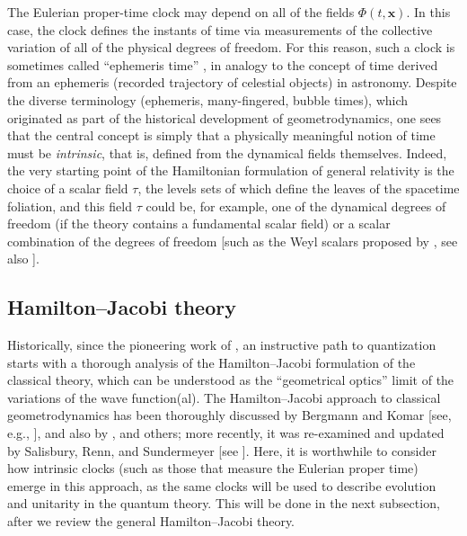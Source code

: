 \documentclass[12pt]{iopart}
\def\x{\mathbf{x}}
\begin{document}
The Eulerian proper-time clock may depend on all of the fields $\Phi(t,\x)$. In this case, the clock defines the instants of time via measurements of the collective variation of all of the physical degrees of freedom. For this reason, such a clock is sometimes called ``ephemeris time'' \citep{Barbour:1994ri,Barbour:1994rj}, in analogy to the concept of time derived from an ephemeris (recorded trajectory of celestial objects) in astronomy. Despite the diverse terminology (ephemeris, many-fingered, bubble times), which originated as part of the historical development of geometrodynamics, one sees that the central concept is simply that a physically meaningful notion of time must be {\em intrinsic}, that is, defined from the dynamical fields themselves. Indeed, the very starting point of the Hamiltonian formulation of general relativity is the choice of a scalar field $\tau$, the levels sets of which define the leaves of the spacetime foliation, and this field $\tau$ could be, for example, one of the dynamical degrees of freedom (if the theory contains a fundamental scalar field) or a scalar combination of the degrees of freedom [such as the Weyl scalars proposed by \citet{Komar:Motions,Komar:1958ymq}, see also \citet{Bergmann:1960wb}].

\subsection{Hamilton--Jacobi theory}
Historically, since the pioneering work of \citet{Schrodinger}, an instructive path to quantization starts with a thorough analysis of the Hamilton--Jacobi formulation of the classical theory, which can be understood as the ``geometrical optics'' limit of the variations of the wave function(al). The Hamilton--Jacobi approach to classical geometrodynamics has been thoroughly discussed by Bergmann and Komar [see, e.g., \citet{Komar:1967htl,Komar:HJVersion,Komar:NewProp,Komar:1971rg,Bergmann:1966zza,Bergmann:1970sa,Bergmann:mixed}], and also by \citet{Peres}, \citet{Gerlach:1969ph} and others; more recently, it was re-examined and updated by Salisbury, Renn, and Sundermeyer [see \citet{Salisbury:2015goa,Salisbury:2019lcg,Salisbury:2022wac,Salisbury:2022bqg}]. Here, it is worthwhile to consider how intrinsic clocks (such as those that measure the Eulerian proper time) emerge in this approach, as the same clocks will be used to describe evolution and unitarity in the quantum theory. This will be done in the next subsection, after we review the general Hamilton--Jacobi theory.
\end{document}
